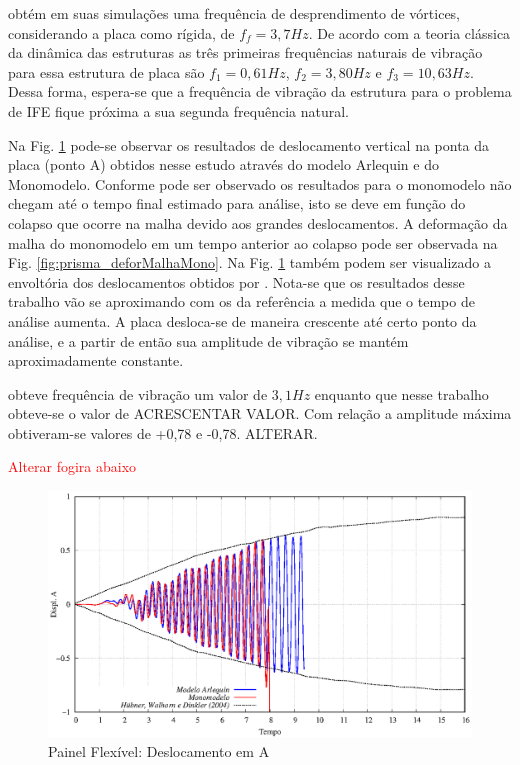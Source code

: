 \documentclass[tese_patricia]{subfiles}
\begin{document}
 obtém em suas simulações uma frequência de desprendimento de vórtices, considerando a placa como rígida, de $f_f = 3,7Hz$. De acordo com a teoria clássica da dinâmica das estruturas as três primeiras frequências naturais de vibração para essa estrutura de placa são $f_1 = 0,61Hz$, $f_2 = 3,80Hz$ e $f_3 = 10,63Hz$. Dessa forma, espera-se que a frequência de vibração da estrutura para o problema de IFE fique próxima a sua segunda frequência natural.

Na Fig. \ref{fig:prisma_deslA} pode-se observar os resultados de deslocamento vertical na ponta da placa (ponto A) obtidos nesse estudo através do modelo Arlequin e do Monomodelo. Conforme pode ser observado os resultados para o monomodelo não chegam até o tempo final estimado para análise, isto se deve em função do colapso que ocorre na malha devido aos grandes deslocamentos. A deformação da malha do monomodelo em um tempo anterior ao colapso pode ser observada na Fig. \ref{fig:prisma_deforMalhaMono}. Na Fig. \ref{fig:prisma_deslA} também podem ser visualizado a envoltória dos deslocamentos obtidos por . Nota-se que os resultados desse trabalho vão se aproximando com os da referência a medida que o tempo de análise aumenta. A placa desloca-se de maneira crescente até certo ponto da análise, e a partir de então sua amplitude de vibração se mantém aproximadamente constante.

 
 obteve frequência de vibração um valor de $3,1Hz$ enquanto que nesse trabalho obteve-se o valor de ACRESCENTAR VALOR. Com relação a amplitude máxima obtiveram-se valores de +0,78 e -0,78. ALTERAR.

\textcolor{red}{Alterar fogira abaixo}

\begin{figure}[htb!]
	\centering 
	\includegraphics[scale=1.0,trim=0cm 0cm 0cm 0cm, clip=true]{Imagens/Cap7/prisma_deslA.eps}	
	\caption{Painel Flexível: Deslocamento em A}
	\label{fig:prisma_deslA}
\end{figure}
\end{document}
